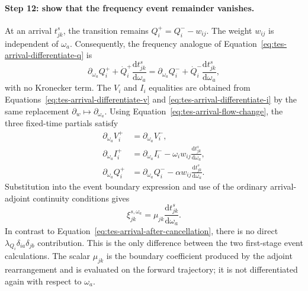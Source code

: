 \paragraph{Step 12: show that the frequency event remainder vanishes.}
At an arrival $t^s_{jk}$, the transition remains
$Q_i^+=Q_i^- -w_{ij}$. The weight $w_{ij}$ is independent of $\omega_a$.
Consequently, the frequency analogue of
Equation~\eqref{eq:tes-arrival-differentiate-q} is
\begin{equation}
    \partial_{\omega_a}Q_i^+
      +\dot Q_i^+\frac{\mathrm dt^s_{jk}}{\mathrm d\omega_a}
      =
      \partial_{\omega_a}Q_i^-
      +\dot Q_i^-\frac{\mathrm dt^s_{jk}}{\mathrm d\omega_a},
    \label{eq:tes-omega-arrival-differentiate-q}
\end{equation}
with no Kronecker term. The $V_i$ and $I_i$ equalities are obtained from
Equations~\eqref{eq:tes-arrival-differentiate-v} and
\eqref{eq:tes-arrival-differentiate-i} by the same replacement
$\partial_w\mapsto\partial_{\omega_a}$.
Using Equation~\eqref{eq:tes-arrival-flow-change}, the three fixed-time
partials satisfy
\begin{align}
    \partial_{\omega_a}V_i^+
      &=\partial_{\omega_a}V_i^-,
      \nonumber\\
    \partial_{\omega_a}I_i^+
      &=\partial_{\omega_a}I_i^-
        -\omega_iw_{ij}
          \frac{\mathrm dt^s_{jk}}{\mathrm d\omega_a},
      \nonumber\\
    \partial_{\omega_a}Q_i^+
      &=\partial_{\omega_a}Q_i^-
        -\alpha w_{ij}
          \frac{\mathrm dt^s_{jk}}{\mathrm d\omega_a}.
    \label{eq:tes-omega-arrival-partial-derivatives}
\end{align}
Substitution into the event boundary expression and use of the ordinary
arrival-adjoint continuity conditions gives
\begin{equation}
    \xi_{jk}^{s,\omega_a}
      =\mu_{jk}\frac{\mathrm dt^s_{jk}}{\mathrm d\omega_a}.
    \label{eq:tes-omega-arrival-after-cancellation}
\end{equation}
In contrast to Equation~\eqref{eq:tes-arrival-after-cancellation}, there is
no direct $\lambda_{Q_i}\delta_{ia}\delta_{jb}$ contribution. This is the
only difference between the two first-stage event calculations. The scalar
$\mu_{jk}$ is the boundary coefficient produced by the adjoint rearrangement
and is evaluated on the forward trajectory; it is not differentiated again
with respect to $\omega_a$.

